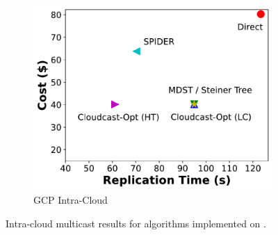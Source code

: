 \begin{figure}[tbp]
    \begin{subfigure}[b]{0.33\textwidth}
        \centering
        \includegraphics[width=\textwidth]{figures/gcp.pdf}
        \caption{GCP Intra-Cloud}
        \label{fig:gcp-intra-cloud}
    \end{subfigure}
    \hfill
    \caption{Intra-cloud multicast results for algorithms implemented on \sys{}.  
    }
    \label{fig:intra-cloud}
\end{figure}